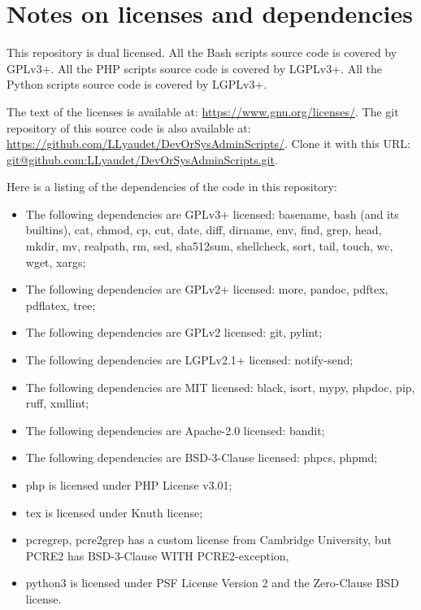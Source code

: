 \documentclass{article}
\begin{document}
\section{Notes on licenses and dependencies}
\label{section:notes_on}

This repository is dual licensed.
All the Bash scripts source code is covered by GPLv3+.
All the PHP scripts source code is covered by LGPLv3+.
All the Python scripts source code is covered by LGPLv3+.

The text of the licenses is available at:
\url{https://www.gnu.org/licenses/}.
The git repository of this source code is also available at:
\url{https://github.com/LLyaudet/DevOrSysAdminScripts/}.
Clone it with this URL:
\url{git@github.com:LLyaudet/DevOrSysAdminScripts.git}.

Here is a listing of the dependencies of the code in this repository:
\begin{itemize}
\item The following dependencies are GPLv3+ licensed:\newline
basename, bash (and its builtins), cat, chmod, cp, cut, date, diff,
dirname, env, find, grep, head, mkdir, mv, realpath, rm, sed,
sha512sum, shellcheck, sort, tail, touch, wc, wget, xargs;
\item The following dependencies are GPLv2+ licensed:\newline
more, pandoc, pdftex, pdflatex, tree;
\item The following dependencies are GPLv2 licensed:\newline
git, pylint;
\item The following dependencies are LGPLv2.1+ licensed:\newline
notify-send;
\item The following dependencies are MIT licensed:\newline
black, isort, mypy, phpdoc, pip, ruff, xmllint;
\item The following dependencies are Apache-2.0 licensed:\newline
bandit;
\item The following dependencies are BSD-3-Clause licensed:\newline
phpcs, phpmd;
\item php is licensed under PHP License v3.01;
\item tex is licensed under Knuth license;
\item pcregrep, pcre2grep has a custom license from Cambridge
University, but PCRE2 has BSD-3-Clause WITH PCRE2-exception,
\item python3 is licensed under PSF License Version 2 and the Zero-Clause
BSD license.
\end{itemize}
\end{document}
